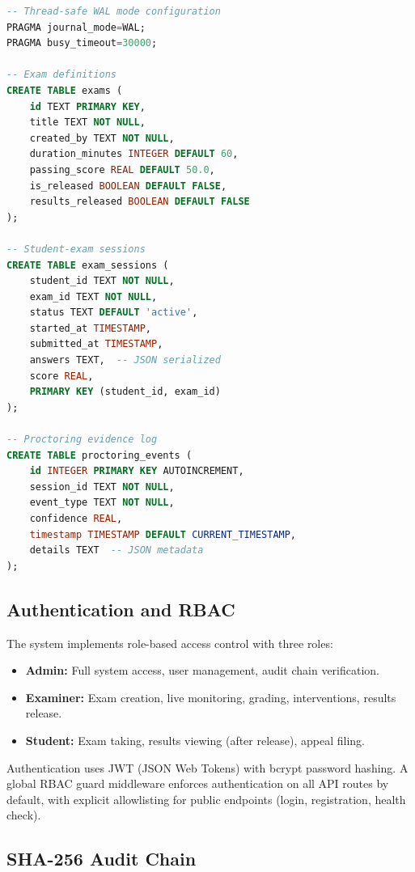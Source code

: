 \documentclass{article}
\begin{document}
\begin{lstlisting}[language=SQL, caption={Core database schema (simplified)}, label={lst:schema}]
-- Thread-safe WAL mode configuration
PRAGMA journal_mode=WAL;
PRAGMA busy_timeout=30000;

-- Exam definitions
CREATE TABLE exams (
    id TEXT PRIMARY KEY,
    title TEXT NOT NULL,
    created_by TEXT NOT NULL,
    duration_minutes INTEGER DEFAULT 60,
    passing_score REAL DEFAULT 50.0,
    is_released BOOLEAN DEFAULT FALSE,
    results_released BOOLEAN DEFAULT FALSE
);

-- Student-exam sessions
CREATE TABLE exam_sessions (
    student_id TEXT NOT NULL,
    exam_id TEXT NOT NULL,
    status TEXT DEFAULT 'active',
    started_at TIMESTAMP,
    submitted_at TIMESTAMP,
    answers TEXT,  -- JSON serialized
    score REAL,
    PRIMARY KEY (student_id, exam_id)
);

-- Proctoring evidence log
CREATE TABLE proctoring_events (
    id INTEGER PRIMARY KEY AUTOINCREMENT,
    session_id TEXT NOT NULL,
    event_type TEXT NOT NULL,
    confidence REAL,
    timestamp TIMESTAMP DEFAULT CURRENT_TIMESTAMP,
    details TEXT  -- JSON metadata
);
\end{lstlisting}

\subsection{Authentication and RBAC}

The system implements role-based access control with three roles:

\begin{itemize}
    \item \textbf{Admin:} Full system access, user management, audit chain verification.
    \item \textbf{Examiner:} Exam creation, live monitoring, grading, interventions, results release.
    \item \textbf{Student:} Exam taking, results viewing (after release), appeal filing.
\end{itemize}

Authentication uses JWT (JSON Web Tokens) with bcrypt password hashing. A global RBAC guard middleware enforces authentication on all API routes by default, with explicit allowlisting for public endpoints (login, registration, health check).

\subsection{SHA-256 Audit Chain}
\end{document}
